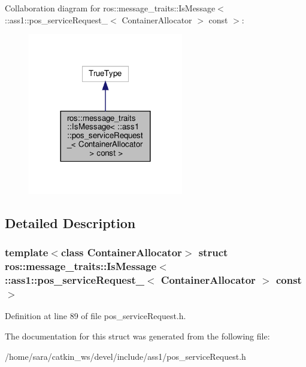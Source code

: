 Collaboration diagram for ros\+:\+:message\+\_\+traits\+:\+:Is\+Message$<$ \+:\+:ass1\+:\+:pos\+\_\+service\+Request\+\_\+$<$ Container\+Allocator $>$ const $>$\+:
\nopagebreak
\begin{figure}[H]
\begin{center}
\leavevmode
\includegraphics[width=192pt]{structros_1_1message__traits_1_1IsMessage_3_01_1_1ass1_1_1pos__serviceRequest___3_01ContainerAllb6cfad3824ea14497ef4a032f2588231}
\end{center}
\end{figure}


\subsection{Detailed Description}
\subsubsection*{template$<$class Container\+Allocator$>$\newline
struct ros\+::message\+\_\+traits\+::\+Is\+Message$<$ \+::ass1\+::pos\+\_\+service\+Request\+\_\+$<$ Container\+Allocator $>$ const $>$}



Definition at line 89 of file pos\+\_\+service\+Request.\+h.



The documentation for this struct was generated from the following file\+:\begin{DoxyCompactItemize}
\item 
/home/sara/catkin\+\_\+ws/devel/include/ass1/pos\+\_\+service\+Request.\+h\end{DoxyCompactItemize}
